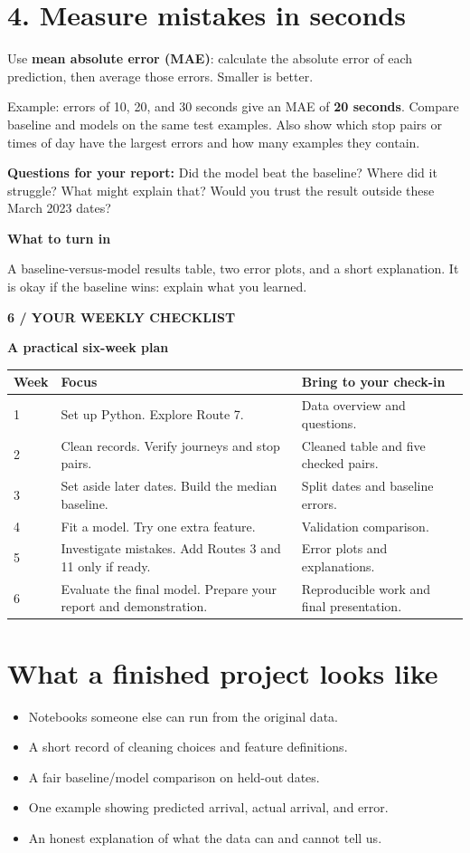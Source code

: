 \documentclass[11pt,letterpaper]{article}
\newcommand{\heading}[2]{{\small\color{accent}\textbf{#1}}\par{\LARGE\bfseries #2}\par\vspace{4pt}}
\newcommand{\turnin}[1]{\vspace{6pt}\colorbox{light}{\parbox{0.96\linewidth}{\textbf{What to turn in}\par #1}}}
\begin{document}
\section*{4. Measure mistakes in seconds}
Use \textbf{mean absolute error (MAE)}: calculate the absolute error of each
prediction, then average those errors. Smaller is better.

Example: errors of 10, 20, and 30 seconds give an MAE of \textbf{20 seconds}.
Compare baseline and models on the same test examples. Also show which
stop pairs or times of day have the largest errors and how many examples they contain.

\textbf{Questions for your report:} Did the model beat the baseline?
Where did it struggle? What might explain that? Would you trust the result
outside these March 2023 dates?

\turnin{A baseline-versus-model results table, two error plots, and a short
explanation. It is okay if the baseline wins: explain what you learned.}

\newpage
\heading{6 / YOUR WEEKLY CHECKLIST}{A practical six-week plan}
\renewcommand{\arraystretch}{1.35}
\begin{tabularx}{\linewidth}{@{}p{0.55in}Xp{1.9in}@{}}
\toprule
\textbf{Week} & \textbf{Focus} & \textbf{Bring to your check-in}\\
\midrule
1 & Set up Python. Explore Route 7. & Data overview and questions.\\
2 & Clean records. Verify journeys and stop pairs. & Cleaned table and five checked pairs.\\
3 & Set aside later dates. Build the median baseline. & Split dates and baseline errors.\\
4 & Fit a model. Try one extra feature. & Validation comparison.\\
5 & Investigate mistakes. Add Routes 3 and 11 only if ready. & Error plots and explanations.\\
6 & Evaluate the final model. Prepare your report and demonstration. & Reproducible work and final presentation.\\
\bottomrule
\end{tabularx}

\section*{What a finished project looks like}
\begin{itemize}
\item Notebooks someone else can run from the original data.
\item A short record of cleaning choices and feature definitions.
\item A fair baseline/model comparison on held-out dates.
\item One example showing predicted arrival, actual arrival, and error.
\item An honest explanation of what the data can and cannot tell us.
\end{itemize}
\end{document}
